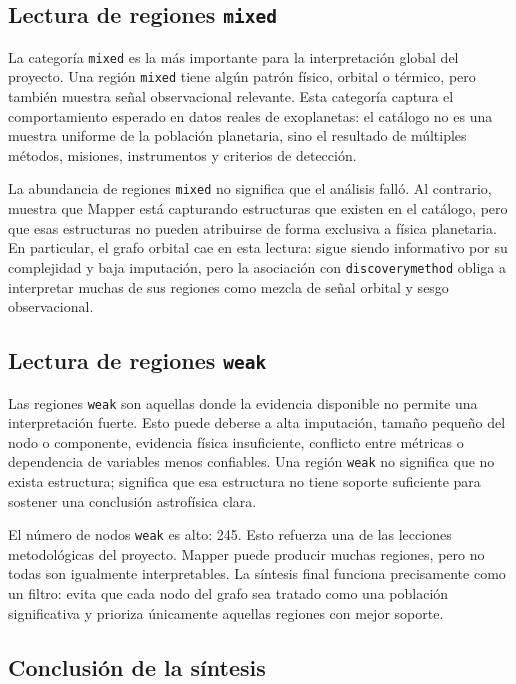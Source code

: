 \subsection*{Lectura de regiones \texttt{mixed}}

La categoría \texttt{mixed} es la más importante para la interpretación global del proyecto. Una región \texttt{mixed} tiene algún patrón físico, orbital o térmico, pero también muestra señal observacional relevante. Esta categoría captura el comportamiento esperado en datos reales de exoplanetas: el catálogo no es una muestra uniforme de la población planetaria, sino el resultado de múltiples métodos, misiones, instrumentos y criterios de detección.

La abundancia de regiones \texttt{mixed} no significa que el análisis falló. Al contrario, muestra que Mapper está capturando estructuras que existen en el catálogo, pero que esas estructuras no pueden atribuirse de forma exclusiva a física planetaria. En particular, el grafo orbital cae en esta lectura: sigue siendo informativo por su complejidad y baja imputación, pero la asociación con \texttt{discoverymethod} obliga a interpretar muchas de sus regiones como mezcla de señal orbital y sesgo observacional.

\subsection*{Lectura de regiones \texttt{weak}}

Las regiones \texttt{weak} son aquellas donde la evidencia disponible no permite una interpretación fuerte. Esto puede deberse a alta imputación, tamaño pequeño del nodo o componente, evidencia física insuficiente, conflicto entre métricas o dependencia de variables menos confiables. Una región \texttt{weak} no significa que no exista estructura; significa que esa estructura no tiene soporte suficiente para sostener una conclusión astrofísica clara.

El número de nodos \texttt{weak} es alto: 245. Esto refuerza una de las lecciones metodológicas del proyecto. Mapper puede producir muchas regiones, pero no todas son igualmente interpretables. La síntesis final funciona precisamente como un filtro: evita que cada nodo del grafo sea tratado como una población significativa y prioriza únicamente aquellas regiones con mejor soporte.

\subsection*{Conclusión de la síntesis}

